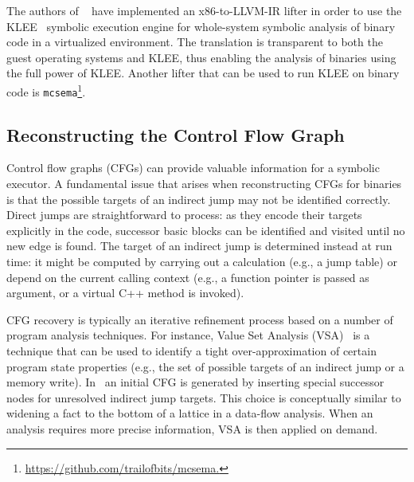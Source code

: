 The authors of \stwoe~\cite{CKC-TOCS12} have implemented an x86-to-LLVM-IR lifter in order to use the KLEE~\cite{KLEE-OSDI08} symbolic execution engine for whole-system symbolic analysis of binary code in a virtualized environment. The translation is transparent to both the guest operating systems and KLEE, thus enabling the analysis of binaries using the full power of KLEE. Another lifter that can be used to run KLEE on binary code is {\tt mcsema}\footnote{\url{https://github.com/trailofbits/mcsema.}}.

\subsection{Reconstructing the Control Flow Graph}

Control flow graphs (CFGs) can provide valuable information for a symbolic executor. A fundamental issue that arises when reconstructing CFGs for binaries is that the possible targets of an indirect jump may not be identified correctly. Direct jumps are straightforward to process: as they encode their targets explicitly in the code, successor basic blocks can be identified and visited until no new edge is found. The target of an indirect jump is determined instead at run time: it might be computed by carrying out a calculation (e.g., a jump table) or depend on the current calling context (e.g., a function pointer is passed as argument, or a virtual C++ method is invoked). %

CFG recovery is typically an iterative refinement process based on a number of program analysis techniques. For instance, Value Set Analysis (VSA)~\cite{VSA-CC04} is a technique that can be used to identify a tight over-approximation of certain program state properties (e.g., the set of possible targets of an indirect jump or a memory write). In~\cite{BITBLAZE-ICISS08} an initial CFG is generated by inserting special successor nodes for unresolved indirect jump targets. This choice is conceptually similar to widening a fact to the bottom of a lattice in a data-flow analysis. When an analysis requires more precise information, VSA is then applied on demand. %

